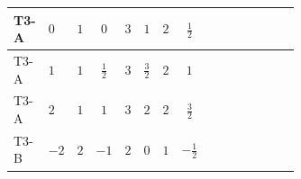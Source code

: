 \documentclass[8pt]{article}
\begin{document}
\begin{landscape}
\begin{longtable}{@{}llcccccc >{\raggedright\arraybackslash}p{0.21\linewidth} >{\raggedright\arraybackslash}p{0.21\linewidth} >{\raggedright\arraybackslash}p{0.21\linewidth}@{}}
\midrule
T3-A & $0$ & $1$ & $0$ & $3$ & $1$ & $2$ & $\frac{1}{2}$ & \scriptsize\adjustbox{max width=\linewidth}{$\begin{gathered} - 3 C_{5} g_{2}^{2}\end{gathered}$} & \scriptsize\adjustbox{max width=\linewidth}{$\begin{gathered} 2 C_{5} \lambda_1\end{gathered}$} & \scriptsize\adjustbox{max width=\linewidth}{$\begin{gathered} - C_{5} Y_e Y_e^\dagger\end{gathered}$} \\
\midrule
T3-A & $1$ & $1$ & $\frac{1}{2}$ & $3$ & $\frac{3}{2}$ & $2$ & $1$ & \scriptsize\adjustbox{max width=\linewidth}{$\begin{gathered} - 3 C_{5} g_{2}^{2}\end{gathered}$} & \scriptsize\adjustbox{max width=\linewidth}{$\begin{gathered} 2 C_{5} \lambda_1\end{gathered}$} & \scriptsize\adjustbox{max width=\linewidth}{$\begin{gathered} - C_{5} Y_e Y_e^\dagger\end{gathered}$} \\
\midrule
T3-A & $2$ & $1$ & $1$ & $3$ & $2$ & $2$ & $\frac{3}{2}$ & \scriptsize\adjustbox{max width=\linewidth}{$\begin{gathered} - 3 C_{5} g_{2}^{2}\end{gathered}$} & \scriptsize\adjustbox{max width=\linewidth}{$\begin{gathered} 2 C_{5} \lambda_1\end{gathered}$} & \scriptsize\adjustbox{max width=\linewidth}{$\begin{gathered} - C_{5} Y_e Y_e^\dagger\end{gathered}$} \\
\midrule
T3-B & $-2$ & $2$ & $-1$ & $2$ & $0$ & $1$ & $-\frac{1}{2}$ & \scriptsize\adjustbox{max width=\linewidth}{$\begin{gathered} - 3 C_{5} g_{2}^{2}\end{gathered}$} & \scriptsize\adjustbox{max width=\linewidth}{$\begin{gathered} 2 C_{5} \lambda_1\end{gathered}$} & \scriptsize\adjustbox{max width=\linewidth}{$\begin{gathered} - C_{5} Y_e Y_e^\dagger\end{gathered}$} \\

\end{longtable}
\end{landscape}
\end{document}
